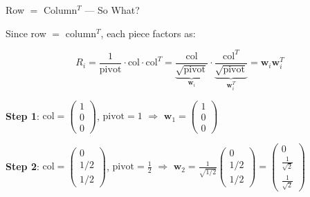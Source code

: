 \documentclass[10pt]{beamer}
\theoremstyle{definition}
\newcommand{\x}[1]{\alert{\textbf{#1}}}
\begin{document}
\begin{frame}{Row $=$ Column$^T$ --- So What?}

Since row $=$ column$^T$, each piece factors as:

$$R_i = \frac{1}{\text{pivot}} \cdot \text{col} \cdot \text{col}^T = \underbrace{\frac{\text{col}}{\sqrt{\text{pivot}}}}_{\mathbf{w}_i} \cdot \underbrace{\frac{\text{col}^T}{\sqrt{\text{pivot}}}}_{\mathbf{w}_i^T} = \mathbf{w}_i \mathbf{w}_i^T$$

\vspace{0.2em}

\x{Step 1}: $\text{col} = \left(\begin{smallmatrix} 1 \\ 0 \\ 0 \end{smallmatrix}\right)$, $\text{pivot} = 1$ \quad $\Longrightarrow$ \quad $\mathbf{w}_1 = \begin{pmatrix} 1 \\ 0 \\ 0 \end{pmatrix}$

\vspace{0.2em}

\x{Step 2}: $\text{col} = \left(\begin{smallmatrix} 0 \\ 1/2 \\ 1/2 \end{smallmatrix}\right)$, $\text{pivot} = \frac{1}{2}$ \quad $\Longrightarrow$ \quad $\mathbf{w}_2 = \frac{1}{\sqrt{1/2}}\left(\begin{smallmatrix} 0 \\ 1/2 \\ 1/2 \end{smallmatrix}\right) = \begin{pmatrix} 0 \\ \frac{1}{\sqrt{2}} \\ \frac{1}{\sqrt{2}} \end{pmatrix}$

\end{frame}
\end{document}
